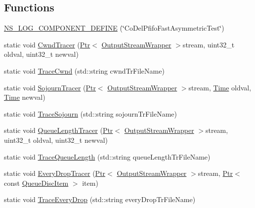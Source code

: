 \subsection*{Functions}
\begin{DoxyCompactItemize}
\item 
\hyperlink{codel-vs-pfifo-asymmetric_8cc_aa27e0ba3b4d4602d11ece90f4a1ee82c}{N\+S\+\_\+\+L\+O\+G\+\_\+\+C\+O\+M\+P\+O\+N\+E\+N\+T\+\_\+\+D\+E\+F\+I\+NE} (\char`\"{}Co\+Del\+Pfifo\+Fast\+Asymmetric\+Test\char`\"{})
\item 
static void \hyperlink{codel-vs-pfifo-asymmetric_8cc_a00b0ede63dc5275483d7e3f7ab0ac706}{Cwnd\+Tracer} (\hyperlink{classns3_1_1Ptr}{Ptr}$<$ \hyperlink{classns3_1_1OutputStreamWrapper}{Output\+Stream\+Wrapper} $>$stream, uint32\+\_\+t oldval, uint32\+\_\+t newval)
\item 
static void \hyperlink{codel-vs-pfifo-asymmetric_8cc_a14abe7eeb70cac35caeaf197fff9942d}{Trace\+Cwnd} (std\+::string cwnd\+Tr\+File\+Name)
\item 
static void \hyperlink{codel-vs-pfifo-asymmetric_8cc_abe5b5ba0be4971f9a8889b1f517637d9}{Sojourn\+Tracer} (\hyperlink{classns3_1_1Ptr}{Ptr}$<$ \hyperlink{classns3_1_1OutputStreamWrapper}{Output\+Stream\+Wrapper} $>$stream, \hyperlink{classns3_1_1Time}{Time} oldval, \hyperlink{classns3_1_1Time}{Time} newval)
\item 
static void \hyperlink{codel-vs-pfifo-asymmetric_8cc_aa8f91732b16706b6be64dda090e6d90e}{Trace\+Sojourn} (std\+::string sojourn\+Tr\+File\+Name)
\item 
static void \hyperlink{codel-vs-pfifo-asymmetric_8cc_a2c05f34753510bfc5337c693bc9db6ad}{Queue\+Length\+Tracer} (\hyperlink{classns3_1_1Ptr}{Ptr}$<$ \hyperlink{classns3_1_1OutputStreamWrapper}{Output\+Stream\+Wrapper} $>$stream, uint32\+\_\+t oldval, uint32\+\_\+t newval)
\item 
static void \hyperlink{codel-vs-pfifo-asymmetric_8cc_ad42ad75e7dad477cc7b101512f13f0a9}{Trace\+Queue\+Length} (std\+::string queue\+Length\+Tr\+File\+Name)
\item 
static void \hyperlink{codel-vs-pfifo-asymmetric_8cc_a3625f5fca3e975c49f2e7643ceb2f55c}{Every\+Drop\+Tracer} (\hyperlink{classns3_1_1Ptr}{Ptr}$<$ \hyperlink{classns3_1_1OutputStreamWrapper}{Output\+Stream\+Wrapper} $>$stream, \hyperlink{classns3_1_1Ptr}{Ptr}$<$ const \hyperlink{classns3_1_1QueueDiscItem}{Queue\+Disc\+Item} $>$ item)
\item 
static void \hyperlink{codel-vs-pfifo-asymmetric_8cc_acc8c5885e95cf5d91788a281acfe977f}{Trace\+Every\+Drop} (std\+::string every\+Drop\+Tr\+File\+Name)

\end{DoxyCompactItemize}
